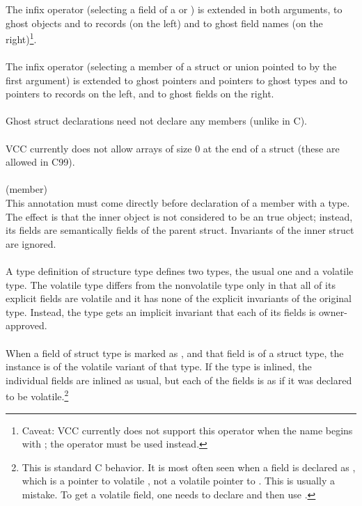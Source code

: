 \documentclass[preprint,nocopyrightspace]{sigplanconf}
\begin{document}
{{{The infix  operator (selecting a field of a 
or ) is extended in both arguments, to ghost objects and to
records (on the left) and to ghost field names (on the right)\footnote{
Caveat: VCC currently does not support this operator when the name begins
with \vcc{\ }; the \vcc{->} operator must be used instead.}.
\\\\
The infix \vcc{->} operator (selecting a member of a struct or union
pointed to by the first argument) is extended to ghost pointers and
pointers to ghost types and to pointers to records on the left, and to
ghost fields on the right.
\\\\
Ghost struct declarations need not declare any members (unlike in C).
\\\\
VCC currently does not allow arrays of size 0 at the end of a struct
(these are allowed in C99).
\\\\
 (member)\\
This annotation must come directly before declaration of a member with
a  type. The effect is that the inner object is not considered to be an
true object; instead, its fields are semantically fields of the
parent struct. Invariants of the inner struct are ignored.
\\\\
A type definition of structure type defines two types, the usual one
and a volatile type. The volatile type differs from the nonvolatile
type only in that all of its explicit fields are volatile and it has
none of the explicit invariants of the original type. Instead, the
type gets an implicit invariant that each of its fields is
owner-approved. 
\\\\
When a field of struct type is marked as , and that
field is of a struct type, the instance is of the volatile variant of
that type. If the type is inlined, the individual fields are inlined
as usual, but each of the fields is as if it was declared to be
volatile.\footnote{
This is standard C behavior. It is most often seen when a field is
declared as , which is a pointer to volatile ,
not a volatile pointer to . This is usually a mistake.
To get a volatile field, one needs to declare 
and then use .
}

}}}
\end{document}
